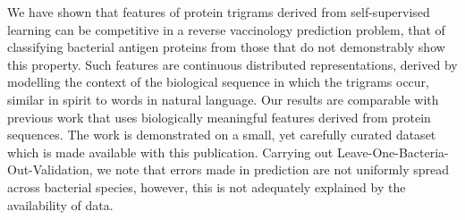 \documentclass[10pt,journal,compsoc,twoside]{IEEEtran}
\begin{document}
We have shown that features of protein trigrams derived from self-supervised learning can be competitive in a reverse vaccinology prediction problem, that of classifying bacterial antigen proteins from those that do not demonstrably show this property. Such features are continuous distributed representations, derived by modelling the context of the biological sequence in which the trigrams occur, similar in spirit to words in natural language. Our results are comparable with previous work that uses biologically meaningful features derived from protein sequences. The work is demonstrated on a small, yet carefully curated dataset which is made available with this publication. Carrying out Leave-One-Bacteria-Out-Validation, we note that errors made in prediction are not uniformly spread across bacterial species, however, this is not adequately explained by the availability of data. 



\ifCLASSOPTIONcaptionsoff
  \newpage
\fi







%
%
%

\end{document}
